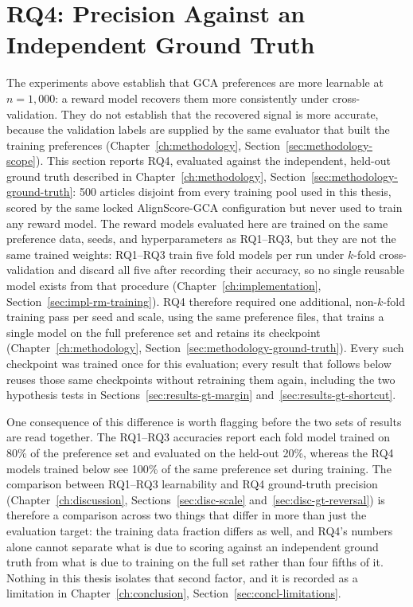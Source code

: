 \section{RQ4: Precision Against an Independent Ground Truth}
\label{sec:results-ground-truth}

The experiments above establish that GCA preferences are more learnable at
$n=1{,}000$: a reward model recovers them more consistently under
cross-validation. They do not establish that the recovered signal is more
accurate, because the validation labels are supplied by the same evaluator
that built the training preferences (Chapter~\ref{ch:methodology},
Section~\ref{sec:methodology-scope}).
This section reports RQ4, evaluated against the independent, held-out ground
truth described in Chapter~\ref{ch:methodology},
Section~\ref{sec:methodology-ground-truth}: 500 articles
disjoint from every training pool used in this thesis, scored by the same
locked AlignScore-GCA configuration but never used to train any reward
model. The reward models evaluated here are trained on the same preference
data, seeds, and hyperparameters as RQ1--RQ3, but they are not the same
trained weights: RQ1--RQ3 train five fold models per run under $k$-fold
cross-validation and discard all five after recording their accuracy, so no
single reusable model exists from that procedure
(Chapter~\ref{ch:implementation}, Section~\ref{sec:impl-rm-training}). RQ4
therefore required one additional, non-$k$-fold training pass per seed and
scale, using the same preference files, that trains a single model on the
full preference set and retains its checkpoint
(Chapter~\ref{ch:methodology}, Section~\ref{sec:methodology-ground-truth}).
Every such checkpoint was trained once for this evaluation; every result
that follows below reuses those same checkpoints without retraining them
again, including the two hypothesis tests in
Sections~\ref{sec:results-gt-margin} and~\ref{sec:results-gt-shortcut}.

One consequence of this difference is worth flagging before the two sets of
results are read together. The RQ1--RQ3 accuracies report each fold model
trained on 80\% of the preference set and evaluated on the held-out 20\%,
whereas the RQ4 models trained below see 100\% of the same preference set
during training. The comparison between RQ1--RQ3 learnability and RQ4
ground-truth precision (Chapter~\ref{ch:discussion},
Sections~\ref{sec:disc-scale} and~\ref{sec:disc-gt-reversal}) is therefore a
comparison across two things that differ in more than just the evaluation
target: the training data fraction differs as well, and RQ4's numbers alone
cannot separate what is due to scoring against an independent ground truth
from what is due to training on the full set rather than four fifths of it.
Nothing in this thesis isolates that second factor, and it is recorded as a
limitation in Chapter~\ref{ch:conclusion}, Section~\ref{sec:concl-limitations}.

